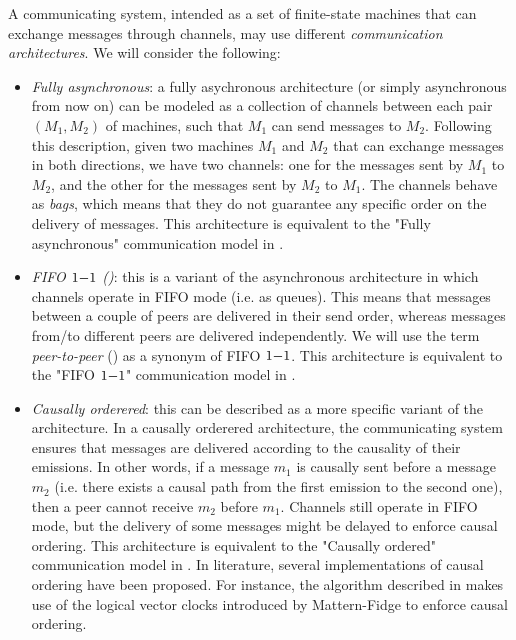 \documentclass{article}
\begin{document}
A communicating system, intended as a set of finite-state machines that can exchange messages through channels, may use different \emph{communication architectures}. We will consider the following:
\begin{itemize}
	\item \emph{Fully asynchronous}: a fully asychronous architecture (or simply asynchronous from now on) can be modeled as a collection of channels between each pair $(M_1,M_2)$ of machines, such that $M_1$ can send messages to $M_2$. Following this description, given two machines $M_1$ and $M_2$ that can exchange messages in both directions, we have two channels: one for the messages sent by $M_1$ to $M_2$, and the other for the messages sent by $M_2$ to $M_1$. The channels behave as \emph{bags}, which means that they do not guarantee any specific order on the delivery of messages. This architecture is equivalent to the "Fully asynchronous" communication model in \cite{DBLP:journals/fac/ChevrouHQ16}.
	\item \emph{FIFO $1\mathsf{-}1$ (\pp)}: this is a variant of the asynchronous architecture in which channels operate in FIFO mode (i.e. as queues). This means that messages between a couple of peers are delivered in their send order, whereas messages from/to different peers are delivered independently. We will use the term \emph{peer-to-peer} (\pp) as a synonym of FIFO $1\mathsf{-}1$. This architecture is equivalent to the "FIFO $1\mathsf{-}1$" communication model in \cite{DBLP:journals/fac/ChevrouHQ16}.
	\item \emph{Causally orderered}: this can be described as a more specific variant of the \pp architecture. In a causally orderered architecture, the communicating system ensures that messages are delivered according to the causality of their emissions. In other words, if a message $m_1$ is causally sent before a message $m_2$ (i.e. there exists a causal path from the first emission to the second one), then a peer cannot receive $m_2$ before $m_1$. Channels still operate in FIFO mode, but the delivery of some messages might be delayed to enforce causal ordering. This architecture is equivalent to the "Causally ordered" communication model in \cite{DBLP:journals/fac/ChevrouHQ16}. In literature, several implementations of causal ordering have been proposed. For instance, the algorithm described in \cite{DBLP:conf/wdag/SchiperES89} makes use of the logical vector clocks introduced by Mattern-Fidge \cite{Fidge88timestampsin, Mattern89virtualtime} to enforce causal ordering.

\end{itemize}
\end{document}
